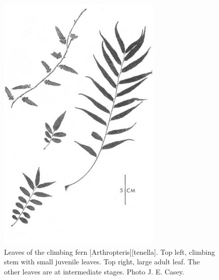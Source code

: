 \begin{figure}[htb]
\begin{minipage}[t]{0.494\textwidth}
    	\centering
    	\includegraphics[width=0.7\textwidth]{graphics/figure28fern.jpg}
    	\caption[Leaves of the climbing fern \emph{Arthropteris tenella}]{Leaves of the climbing fern [Arthropteris][tenella].
    	Top left, climbing stem with small juvenile leaves.
    	Top right, large adult leaf.
    	The other leaves are at intermediate stages.
    	Photo  J. E. Casey.}%
    	\label{fig:28fern}
	\end{minipage}
\end{figure}

